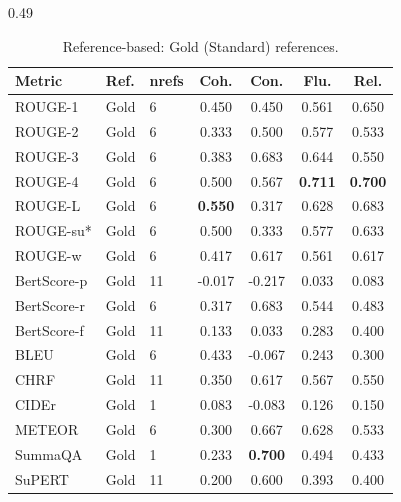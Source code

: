 \begin{table}[h!]
\scriptsize
\centering
\setlength{\tabcolsep}{1pt}
\begin{subtable}[t]{0.49\textwidth}
\centering
\begin{tabular}{lllcccc}
\toprule
\textbf{Metric} & \textbf{Ref.} & \textbf{nrefs}
  & \textbf{Coh.} & \textbf{Con.} & \textbf{Flu.} & \textbf{Rel.} \\
\midrule
\rowcolor{refbased}
ROUGE-1 & Gold & 6 & 0.450 & 0.450 & 0.561 & 0.650 \\
\rowcolor{refbased}
ROUGE-2 & Gold & 6 & 0.333 & 0.500 & 0.577 & 0.533 \\
\rowcolor{refbased}
ROUGE-3 & Gold & 6 & 0.383 & 0.683 & 0.644 & 0.550 \\
\rowcolor{refbased}
ROUGE-4 & Gold & 6 & 0.500 & 0.567 & \textbf{0.711} & \textbf{0.700} \\
\rowcolor{refbased}
ROUGE-L & Gold & 6 & \textbf{0.550} & 0.317 & 0.628 & 0.683 \\
\rowcolor{refbased}
ROUGE-su* & Gold & 6 & 0.500 & 0.333 & 0.577 & 0.633 \\
\rowcolor{refbased}
ROUGE-w & Gold & 6 & 0.417 & 0.617 & 0.561 & 0.617 \\
\rowcolor{refbased}
BertScore-p & Gold & 11 & -0.017 & -0.217 & 0.033 & 0.083 \\
\rowcolor{refbased}
BertScore-r & Gold & 6 & 0.317 & 0.683 & 0.544 & 0.483 \\
\rowcolor{refbased}
BertScore-f & Gold & 11 & 0.133 & 0.033 & 0.283 & 0.400 \\
\rowcolor{refbased}
BLEU & Gold & 6 & 0.433 & -0.067 & 0.243 & 0.300 \\
\rowcolor{refbased}
CHRF & Gold & 11 & 0.350 & 0.617 & 0.567 & 0.550 \\
\rowcolor{refbased}
CIDEr & Gold & 1 & 0.083 & -0.083 & 0.126 & 0.150 \\
\rowcolor{refbased}
METEOR & Gold & 6 & 0.300 & 0.667 & 0.628 & 0.533 \\
\rowcolor{refbased}
SummaQA & Gold & 1 & 0.233 & \textbf{0.700} & 0.494 & 0.433 \\
\rowcolor{refbased}
SuPERT & Gold & 11 & 0.200 & 0.600 & 0.393 & 0.400 \\
\bottomrule
\end{tabular}
\caption{Reference-based: Gold (Standard) references.}

\end{subtable}
\end{table}

